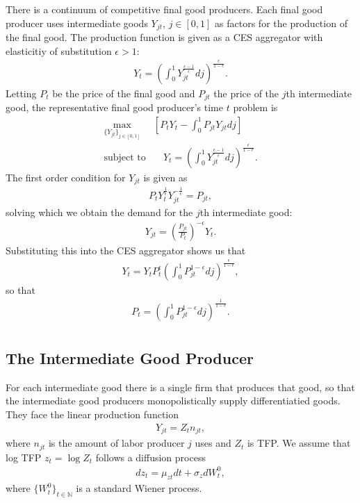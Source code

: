 \documentclass[notitlepage,a4paper,11pt]{report}
\numberwithin{section}{chapter}
\numberwithin{subsection}{section}
\begin{document}
There is a continuum of competitive final good producers. Each final good producer uses intermediate goods $Y_{jt}$, $j \in [0,1]$ as factors for the production of the final good. The production function is given as a CES aggregator with elasticitiy of substitution $\epsilon>1$: 
\begin{align*}
Y_t = \left( \int_0^1 Y_{jt}^{\frac{\epsilon-1}{\epsilon}} dj \right)^{\frac{\epsilon}{1-\epsilon} }. 
\end{align*}
Letting $P_t$ be the price of the final good and $P_{jt}$ the price of the $j$th intermediate good, the representative final good producer's time $t$ problem is 
\begin{align*}
\max_{ \{ Y_{jt} \}_{j \in [0,1]} } & \left[ P_t Y_t - \int_0^1 P_{jt} Y_{jt} dj \right] \\[10pt]
\text{subject to} & \quad Y_t = \left( \int_0^1 Y_{jt}^{\frac{\epsilon-1}{\epsilon}} dj \right)^{\frac{\epsilon}{1-\epsilon} }. 
\end{align*}
The first order condition for $Y_{jt}$ is given as 
\begin{align*}
P_t Y_t^{\frac{1}{\epsilon}} Y_{jt}^{-\frac{1}{\epsilon}} = P_{jt}, 
\end{align*}
solving which we obtain the demand for the $j$th intermediate good: 
\begin{align*}
Y_{jt } =\left( \frac{ P_{jt}}{P_t} \right)^{-\epsilon} Y_t. 
\end{align*}
Substituting this into the CES aggregator shows us that 
\begin{align*}
Y_t = Y_t  P_t^{\epsilon} \left( \int_0^1 P_{jt}^{1-\epsilon} dj \right)^{\frac{\epsilon}{1-\epsilon} }, 
\end{align*}
so that 
\begin{align*}
P_t = \left( \int_0^1 P_{jt}^{1-\epsilon} dj \right)^{\frac{1}{1-\epsilon}}. \\
\end{align*}



\pagebreak


\subsection{The Intermediate Good Producer}

For each intermediate good there is a single firm that produces that good, so that the intermediate good producers monopolistically supply differentiatied goods. They face the linear production function 
\begin{align*}
Y_{jt} =Z_t n_{jt}, 
\end{align*}
where $n_{jt}$ is the amount of labor producer $j$ uses and $Z_t$ is TFP. We assume that log TFP $z_t = \log Z_t$ follows a diffusion process 
\begin{align*}
dz_t = \mu_{zt} dt + \sigma_z dW_t^0, 
\end{align*}
where $\{ W_t^0 \}_{t \in \mathbb{N}}$ is a standard Wiener process. 
\end{document}
